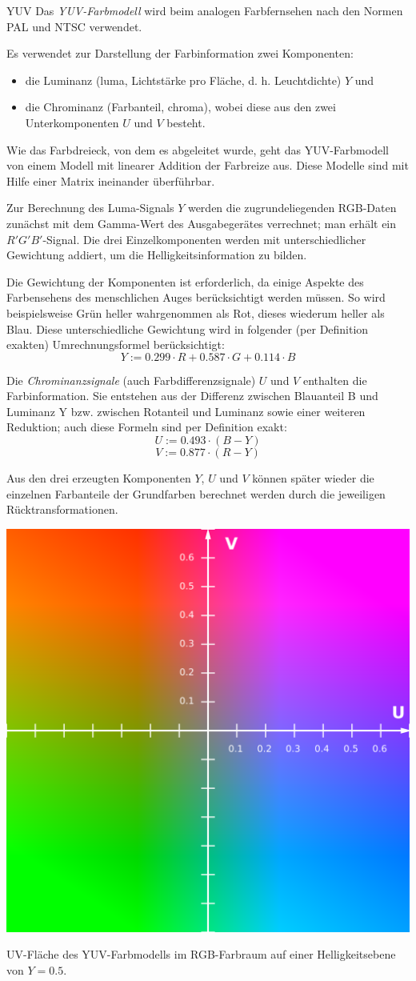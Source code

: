 \begin{defi}[Farbmodell]{YUV}
    Das \emph{YUV-Farbmodell} wird beim analogen Farbfernsehen nach den Normen PAL und NTSC verwendet.

    Es verwendet zur Darstellung der Farbinformation zwei Komponenten:
    \begin{itemize}
        \item die Luminanz (luma, Lichtstärke pro Fläche, d. h. Leuchtdichte) $Y$ und
        \item die Chrominanz (Farbanteil, chroma), wobei diese aus den zwei Unterkomponenten $U$ und $V$ besteht.
    \end{itemize}

    Wie das Farbdreieck, von dem es abgeleitet wurde, geht das YUV-Farbmodell von einem Modell mit linearer Addition der Farbreize aus.
    Diese Modelle sind mit Hilfe einer Matrix ineinander überführbar.

    Zur Berechnung des Luma-Signals $Y$ werden die zugrundeliegenden RGB-Daten zunächst mit dem Gamma-Wert des Ausgabegerätes verrechnet;
    man erhält ein $R'G'B'$-Signal.
    Die drei Einzelkomponenten werden mit unterschiedlicher Gewichtung addiert, um die Helligkeitsinformation zu bilden.

    Die Gewichtung der Komponenten ist erforderlich, da einige Aspekte des Farbensehens des menschlichen Auges berücksichtigt werden müssen.
    So wird beispielsweise Grün heller wahrgenommen als Rot, dieses wiederum heller als Blau.
    Diese unterschiedliche Gewichtung wird in folgender (per Definition exakten) Umrechnungsformel berücksichtigt:
    \[
        Y := 0.299 \cdot R + 0.587 \cdot G + 0.114 \cdot B
    \]

    Die \emph{Chrominanzsignale} (auch Farbdifferenzsignale) $U$ und $V$ enthalten die Farbinformation. Sie entstehen aus der Differenz zwischen Blauanteil B und Luminanz Y bzw. zwischen Rotanteil und Luminanz sowie einer weiteren Reduktion;
    auch diese Formeln sind per Definition exakt:
    \[
        U := 0.493 \cdot (B - Y)
    \]
    \[
        V := 0.877 \cdot (R - Y)
    \]

    Aus den drei erzeugten Komponenten $Y$, $U$ und $V$ können später wieder die einzelnen Farbanteile der Grundfarben berechnet werden durch die jeweiligen Rücktransformationen.

    \centering
    \includegraphics[width=.4\linewidth]{figures/YUV-UV_Scaled_Y0.5_70_percent.png}

    UV-Fläche des YUV-Farbmodells im RGB-Farbraum auf einer Helligkeitsebene von $Y = 0.5$.
\end{defi}

